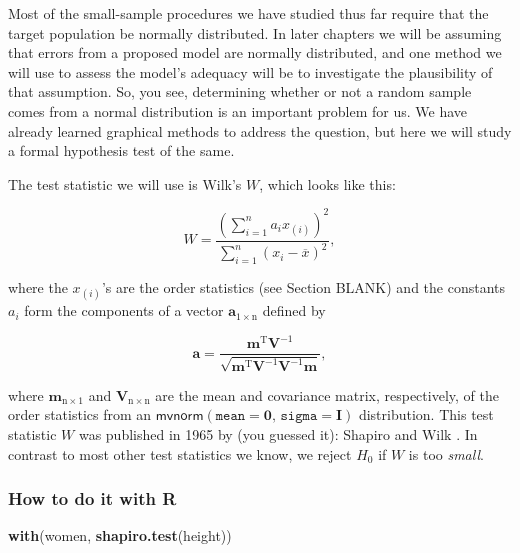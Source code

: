 \documentclass[]{book}
\newenvironment{Shaded}{\begin{snugshade}}{\end{snugshade}}
\newcommand{\KeywordTok}[1]{\textcolor[rgb]{0.13,0.29,0.53}{\textbf{{#1}}}}
\newcommand{\NormalTok}[1]{{#1}}
\numberwithin{equation}{chapter}
\numberwithin{figure}{chapter}
\theoremstyle{plain}
\theoremstyle{definition}
\theoremstyle{remark}
\theoremstyle{definition}
\theoremstyle{definition}
\theoremstyle{remark}
\begin{document}
Most of the small-sample procedures we have studied thus far require
that the target population be normally distributed. In later chapters we
will be assuming that errors from a proposed model are normally
distributed, and one method we will use to assess the model's adequacy
will be to investigate the plausibility of that assumption. So, you see,
determining whether or not a random sample comes from a normal
distribution is an important problem for us. We have already learned
graphical methods to address the question, but here we will study a
formal hypothesis test of the same.

The test statistic we will use is Wilk's \(W\), which looks like this:

\begin{equation}
W = \frac{\left(\sum_{i = 1}^{n} a_{i}x_{(i)} \right)^{2}}{\sum_{i = 1}^{n}(x_{i} - \overline{x})^{2}},
\end{equation}

where the \(x_{(i)}\)'s are the order statistics (see Section BLANK) and
the constants \(a_{i}\) form the components of a vector
\(\mathbf{a}_{1\times\mathrm{n}}\) defined by

\begin{equation}
\mathbf{a}=\frac{\mathbf{m}^{\mathrm{T}}\mathbf{V}^{-1}}{\sqrt{\mathbf{m}^{\mathrm{T}}\mathbf{V}^{-1}\mathbf{V}^{-1}\mathbf{m}}},
\end{equation}

where \(\mathbf{m}_{\mathrm{n}\times1}\) and
\(\mathbf{V}_{\mathrm{n} \times \mathrm{n}}\) are the mean and
covariance matrix, respectively, of the order statistics from an
\(\mathsf{mvnorm} \left(\mathtt{mean} = \mathbf{0},\,\mathtt{sigma} = \mathbf{I}\right)\)
distribution. This test statistic \(W\) was published in 1965 by (you
guessed it): Shapiro and Wilk \autocite{Wilk1965}. In contrast to most
other test statistics we know, we reject \(H_{0}\) if \(W\) is too
\emph{small}.

\subsubsection{How to do it with R}\label{how-to-do-it-with-r-45}

\begin{Shaded}
\begin{Highlighting}[]
\KeywordTok{with}\NormalTok{(women, }\KeywordTok{shapiro.test}\NormalTok{(height))}
\end{Highlighting}
\end{Shaded}
\end{document}
